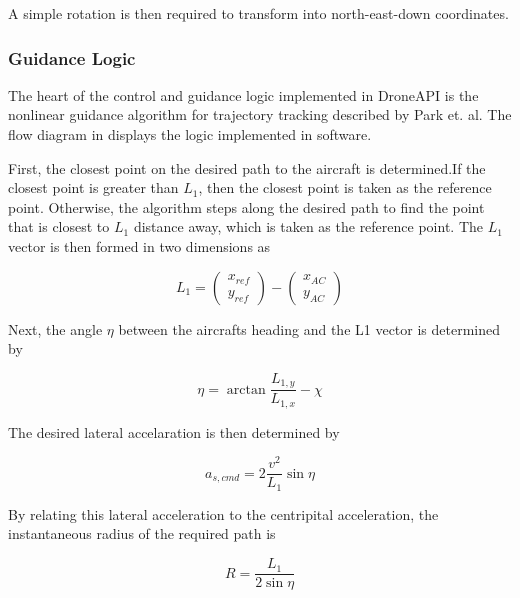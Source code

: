 \documentclass{aiaa}
\begin{document}
    A simple rotation is then required to transform into north-east-down coordinates.

\subsubsection{Guidance Logic}

The heart of the control and guidance logic implemented in DroneAPI is the nonlinear guidance algorithm for trajectory tracking described by Park et. al. The flow diagram in  displays the logic implemented in software. 


First, the closest point on the desired path to the aircraft is determined.If the closest point is greater than $L_1$, then the closest point is taken as the reference point. Otherwise, the algorithm steps along the desired path to find the point that is closest to $L_1$ distance away, which is taken as the reference point. The $L_1$ vector is then formed in two dimensions as

\begin{equation}
	L_1 = 
    \begin{pmatrix}
    	x_{ref}\\
        y_{ref}
    \end{pmatrix}
    -
    \begin{pmatrix}
    	x_{AC}\\
        y_{AC}
    \end{pmatrix}
\end{equation}

Next, the angle $\eta$ between the aircrafts heading and the L1 vector is determined by

\begin{equation}
	\eta = \arctan{\frac{L_{1,y}}{L_{1,x}}} - \chi
\end{equation}

The desired lateral accelaration is then determined by

\begin{equation}
	a_{s,cmd} = 2\frac{v^2}{L_1}\sin{\eta}
    \end{equation}
    
    By relating this lateral acceleration to the centripital acceleration, the instantaneous radius of the required path is
    
    \begin{equation}
    R = \frac{L_1}{2\sin{\eta}}
    \end{equation}
    
\end{document}
